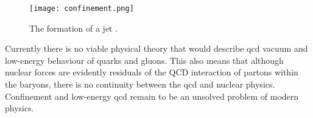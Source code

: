	 \begin{figure}[htpb]
	\texttt{[image: confinement.png]}
	\caption{The formation of a jet \cite{conf_wiki}. }
	\label{fig::jet}
	\end{figure}
Currently there is no viable physical theory that would describe \gls{qcd} vacuum and low-energy behaviour of quarks and gluons. This also means that although nuclear forces are evidently residuals of the QCD interaction of partons within the baryons, there is no continuity between the \gls{qcd} and nuclear physics. Confinement and low-energy \gls{qcd} remain to be an unsolved problem of modern physics. 



